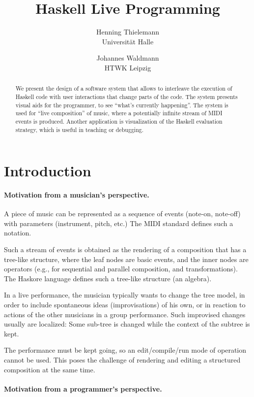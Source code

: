 \documentclass[a4paper]{easychair}
\title{Haskell Live Programming}
\author{
  Henning Thielemann \\ Universität Halle 
  \and
  Johannes Waldmann \\ HTWK Leipzig
}
\begin{document}
\maketitle

\begin{abstract}
  We present the design of a software system 
  that allows to interleave the execution of Haskell code
  with user interactions that change parts of the code.
  The system presents visual aids for the programmer,
  to see ``what's currently happening''.
  The system is used for ``live composition'' of music,
  where a potentially infinite stream of MIDI events is produced.
  Another application is visualization of the Haskell
  evaluation strategy, which is useful in  teaching or debugging.
\end{abstract}

\section{Introduction}

\paragraph{Motivation from a musician's perspective.}

A piece of music can be represented as a sequence of events
(note-on, note-off) with parameters (instrument, pitch, etc.)
The MIDI standard \cite{mma:midispec} defines such a notation.

Such a stream of events is obtained as the rendering
of a composition that has a tree-like structure,
where the leaf nodes are basic events,
and the inner nodes are operators (e.g., for
sequential and parallel composition, and transformations).
The Haskore language \cite{hudak:theory} defines such a tree-like structure
(an algebra).

In a live performance, the musician typically wants to change
the tree model, in order to include spontaneous ideas
(improvisations) of his own, or in reaction to actions of
the other musicians in a group performance.
Such improvised changes usually are localized: Some
sub-tree is changed while the context of the subtree is kept.

The performance must be kept going, so an edit/compile/run mode
of operation cannot be used. This poses the challenge of
rendering and editing a structured composition at the same time.

\paragraph{Motivation from a programmer's perspective.}
\end{document}
